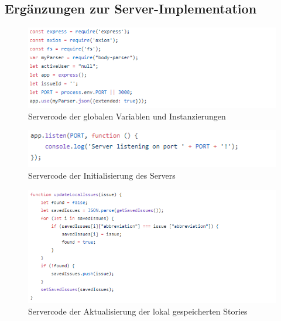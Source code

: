 \documentclass[12pt,titlepage]{scrartcl}
\begin{document}
\begin{appendix}
 	 	\section{Ergänzungen zur Server-Implementation} \label{ANHServer}
 	  		\begin{figure}[H] 
  				\centering
    			\includegraphics[height=0.25\textheight]{serverHead}
  				\caption{Servercode der globalen Variablen und Instanzierungen}
  				\label{fig:ANHserverHead}
			\end{figure}
 	  		\begin{figure}[H] 
  				\centering
    			\includegraphics[height=0.09\textheight]{serverAppListen}
  				\caption{Servercode der Initialisierung des Servers}
  				\label{fig:ANHserverAppListen}
			\end{figure}
 	  		\begin{figure}[H] 
  				\centering
    			\includegraphics[height=0.4\textheight]{serverUpdateLocal}
  				\caption{Servercode der Aktualisierung der lokal gespeicherten Stories}
  				\label{fig:ANHserverUpdateLocal}
			\end{figure}
 	  		\begin{figure}[H] 
  				\centering

\end{figure}
\end{appendix}
\end{document}
